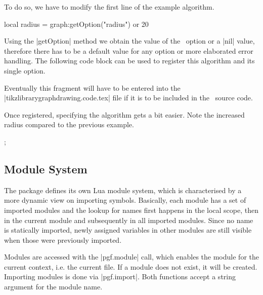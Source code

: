 To do so, we have to modify the first line of the example algorithm.

\begin{codeexample}
   local radius = graph:getOption("radius") or 20
\end{codeexample}

Using the |getOption| method we obtain the value of the
\tikzname\ option or a |nil| value, therefore there has to be a
default value for any option or more elaborated error handling.  The 
following code block can be used to register this algorithm and
its single option.

\begin{codeexample}
\end{codeexample}


Eventually this fragment will have to be entered into the
|tikzlibrarygraphdrawing.code.tex| file if it is to be included in the
\pgfname\ source code.

Once registered, specifying the algorithm gets a bit easier. Note the
increased radius compared to the previous example.

\begin{codeexample}[]
\tikzpicture [graph drawing={simpleexample, radius = 30}]
  ;
\endtikzpicture
\end{codeexample}

\subsection{Module System}
The package defines its own Lua module system, which is characterised by a
more dynamic view on importing symbols.  Basically, each module has a
set of imported modules and the lookup for names first happens in the local
scope, then in the current module and subsequently in all imported
modules.  Since no name is statically imported, newly assigned
variables in other modules are still visible when those were
previously imported.

Modules are accessed with the |pgf.module| call, which enables the
module for the current context, i.e. the current file. If a module
does not exist, it will be created.  Importing modules is done via
|pgf.import|.  Both functions accept a string argument for the
module name.

